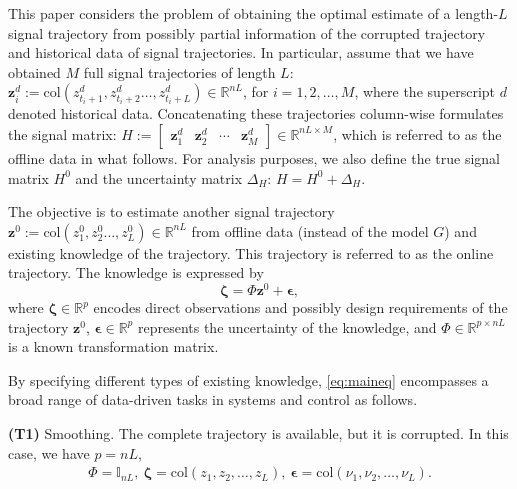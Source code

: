 \documentclass{ifacconf}
\newcommand{\col}[1]{\mathrm{col}\left(#1\right)}
\begin{document}
This paper considers the problem of obtaining the optimal estimate of a length-$L$ signal trajectory from possibly partial information of the corrupted trajectory and historical data of signal trajectories. In particular, assume that we have obtained $M$ full signal trajectories of length $L$: $\mathbf{z}^d_i := \col{z^d_{t_i+1},z^d_{t_i+2}\dots,z^d_{t_i+L}}\in\mathbb{R}^{nL}$, for $i=1,2,\dots,M$, where the superscript $d$ denoted historical data. Concatenating these trajectories column-wise formulates the signal matrix: $H:= \begin{bmatrix}\mathbf{z}^d_1&\mathbf{z}^d_2&\cdots&\mathbf{z}^d_M\end{bmatrix}\in\mathbb{R}^{nL\times M}$, which is referred to as the offline data in what follows. For analysis purposes, we also define the true signal matrix $H^0$ and the uncertainty matrix $\Delta_H$: $H=H^0+\Delta_H$.

The objective is to estimate another signal trajectory $\mathbf{z}^0 := \col{z_1^0,z_2^0\dots,z_L^0}\in\mathbb{R}^{nL}$ from offline data (instead of the model $G$) and existing knowledge of the trajectory. This trajectory is referred to as the online trajectory. The knowledge is expressed by
\begin{equation}
    \boldsymbol{\zeta} = \Phi\mathbf{z}^0 + \boldsymbol{\epsilon},
    \label{eq:maineq}
\end{equation}
where $\boldsymbol{\zeta}\in\mathbb{R}^p$ encodes direct observations and possibly design requirements of the trajectory $\mathbf{z}^0$, $\boldsymbol{\epsilon}\in\mathbb{R}^p$ represents the uncertainty of the knowledge, and $\Phi\in\mathbb{R}^{p\times nL}$ is a known transformation matrix.

By specifying different types of existing knowledge, \eqref{eq:maineq} encompasses a broad range of data-driven tasks in systems and control as follows.

\textbf{(T1)} Smoothing. The complete trajectory is available, but it is corrupted. In this case, we have $p=nL$,
\begin{align*}
    \Phi=\mathbb{I}_{nL},\ \boldsymbol{\zeta}=\col{z_1,z_2,\dots,z_L},\ \boldsymbol{\epsilon}=\col{\nu_1,\nu_2,\dots,\nu_L}.
\end{align*}
\end{document}
